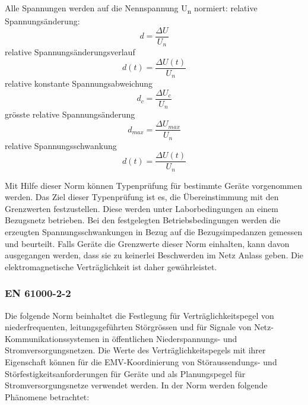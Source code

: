 Alle Spannungen werden auf die Nennspannung U\textsubscript{n} normiert:
relative Spannungsänderung:
\begin{equation}\label{eq:relative Spannungsänderung}
d = \frac{\Delta U}{ U_n}
\end{equation}
relative Spannungsänderungsverlauf
\begin{equation}\label{eq:relative Spannungsänderungsverlauf}
d(t) = \frac{\Delta U(t)}{ U_n}
\end{equation}
relative konstante Spannungsabweichung
\begin{equation}\label{eq:relative konstante Spannungsabweichung}
d_c = \frac{\Delta U_c}{ U_n}
\end{equation}
grösste relative Spannungsänderung
\begin{equation}\label{eq:grösste relative Spannungsänderung}
d_{max} = \frac{\Delta U_{max}}{ U_n}
\end{equation}
relative Spannungsschwankung
\begin{equation}\label{eq:relative Spannungsschwankung}
d(t) = \frac{\Delta U(t)}{ U_n}
\end{equation}


Mit Hilfe dieser Norm können Typenprüfung für bestimmte Geräte vorgenommen werden. Das Ziel dieser Typenprüfung ist es, die Übereinstimmung mit den Grenzwerten festzustellen. Diese werden unter Laborbedingungen an einem Bezugsnetz betrieben. Bei den festgelegten Betriebsbedingungen werden die erzeugten Spannungsschwankungen in Bezug auf die Bezugsimpedanzen gemessen und beurteilt. Falls Geräte die Grenzwerte dieser Norm einhalten, kann davon ausgegangen werden, dass sie zu keinerlei Beschwerden im Netz Anlass geben. Die elektromagnetische Verträglichkeit ist daher gewährleistet. 


\subsubsection{EN 61000-2-2}

Die folgende Norm beinhaltet die Festlegung für Verträglichkeitspegel von niederfrequenten, leitungsgeführten Störgrössen und für Signale von Netz-Kommunikationssystemen in öffentlichen Niederspannungs- und Stromversorgungsnetzen. Die Werte des Verträglichkeitspegels mit ihrer Eigenschaft können für die EMV-Koordinierung von Störaussendungs- und Störfestigkeitsanforderungen für Geräte und als Planungspegel für Stromversorgungsnetze verwendet werden. In der Norm werden folgende Phänomene betrachtet:


